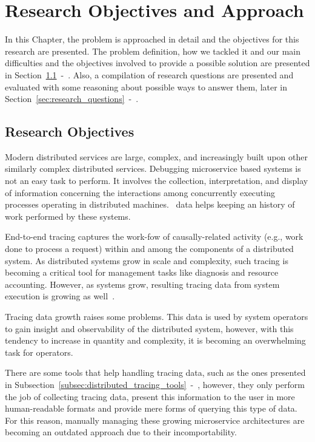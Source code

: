 \glsresetall
\chapter{Research Objectives and Approach}
\label{chap:research_objectives_and_approach}

In this Chapter, the problem is approached in detail and the objectives for this research are presented. The problem definition, how we tackled it and our main difficulties and the objectives involved to provide a possible solution are presented in Section~\ref{sec:problem_definition}~-~. Also, a compilation of research questions are presented and evaluated with some reasoning about possible ways to answer them, later in Section~\ref{sec:research_questions}~-~.

\section{Research Objectives}
\label{sec:problem_definition}

Modern distributed services are large, complex, and increasingly built upon other similarly complex distributed services. Debugging microservice based systems is not an easy task to perform. It involves the collection, interpretation, and display of information concerning the interactions among concurrently executing processes operating in distributed machines.~ data helps keeping an history of work performed by these systems.

End-to-end tracing captures the work-fow of causally-related activity (e.g., work done to process a request) within and among the components of a distributed system. As distributed systems grow in scale and complexity, such tracing is becoming a critical tool for management tasks like diagnosis and resource accounting. However, as systems grow, resulting tracing data from system execution is growing as well~\cite{Sambasivan2014}.

Tracing data growth raises some problems. This data is used by system operators to gain insight and observability of the distributed system, however, with this tendency to increase in quantity and complexity, it is becoming an overwhelming task for operators.

There are some tools that help handling tracing data, such as the ones presented in Subsection~\ref{subsec:distributed_tracing_tools}~-~, however, they only perform the job of collecting tracing data, present this information to the user in more human-readable formats and provide mere forms of querying this type of data. For this reason, manually managing these growing microservice architectures are becoming an outdated approach due to their incomportability.

